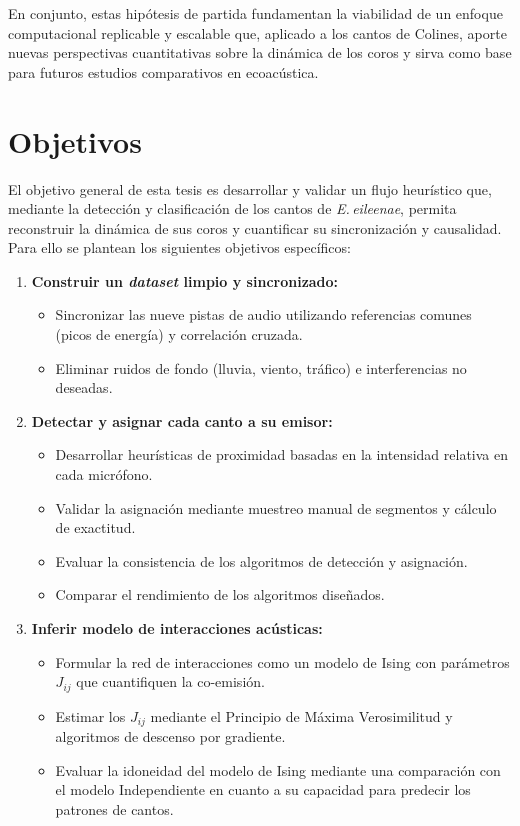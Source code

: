 En conjunto, estas hipótesis de partida fundamentan la 
viabilidad de un enfoque computacional replicable y escalable 
que, aplicado a los cantos de Colines, aporte 
nuevas perspectivas cuantitativas sobre la dinámica de los coros 
y sirva como base para futuros estudios comparativos en 
ecoacústica.  


\section{Objetivos}
\label{sec:objetivos}

El objetivo general de esta tesis es desarrollar y 
validar un flujo heurístico que, mediante la detección y 
clasificación de los cantos de \emph{E.\,eileenae}, permita 
reconstruir la dinámica de sus coros y cuantificar su 
sincronización y causalidad.
Para ello se plantean los siguientes objetivos específicos:

\begin{enumerate}
  \item \textbf{Construir un \emph{dataset} limpio y sincronizado:}  
    \begin{itemize}
      \item Sincronizar las nueve pistas de audio utilizando referencias comunes (picos de energía) y correlación cruzada.  \cite{costa2021comparing}
      \item Eliminar ruidos de fondo (lluvia, viento, tráfico) e interferencias no deseadas.
    \end{itemize}
  \item \textbf{Detectar y asignar cada canto a su emisor:}  
    \begin{itemize}
      \item Desarrollar heurísticas de proximidad basadas en la intensidad relativa en cada micrófono.  
      \item Validar la asignación mediante muestreo manual de segmentos y cálculo de exactitud.
      \item Evaluar la consistencia de los algoritmos de detección y asignación.
      \item Comparar el rendimiento de los algoritmos diseñados.
    \end{itemize}
  \item \textbf{Inferir modelo de interacciones acústicas:}  
    \begin{itemize}
      \item Formular la red de interacciones como un modelo de Ising con parámetros \(J_{ij}\) que cuantifiquen la co-emisión.  
      \item Estimar los \(J_{ij}\) mediante el Principio de Máxima Verosimilitud y algoritmos de descenso por gradiente.
      \item Evaluar la idoneidad del modelo de Ising mediante una comparación con el modelo Independiente en cuanto a su capacidad para predecir los patrones de cantos.
    \end{itemize}
\end{enumerate}


